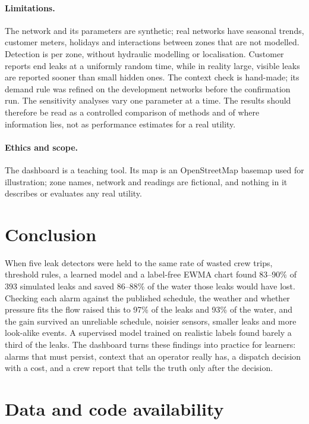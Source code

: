\documentclass[11pt,a4paper]{article}
\begin{document}
\paragraph{Limitations.} The network and its parameters are synthetic; real networks have seasonal trends, customer meters, holidays and interactions between zones that are not modelled. Detection is per zone, without hydraulic modelling or localisation. Customer reports end leaks at a uniformly random time, while in reality large, visible leaks are reported sooner than small hidden ones. The context check is hand-made; its demand rule was refined on the development networks before the confirmation run. The sensitivity analyses vary one parameter at a time. The results should therefore be read as a controlled comparison of methods and of where information lies, not as performance estimates for a real utility.

\paragraph{Ethics and scope.} The dashboard is a teaching tool. Its map is an OpenStreetMap basemap used for illustration; zone names, network and readings are fictional, and nothing in it describes or evaluates any real utility.

\section{Conclusion}

When five leak detectors were held to the same rate of wasted crew trips, threshold rules, a learned model and a label-free EWMA chart found 83--90\% of 393 simulated leaks and saved 86--88\% of the water those leaks would have lost. Checking each alarm against the published schedule, the weather and whether pressure fits the flow raised this to 97\% of the leaks and 93\% of the water, and the gain survived an unreliable schedule, noisier sensors, smaller leaks and more look-alike events. A supervised model trained on realistic labels found barely a third of the leaks. The dashboard turns these findings into practice for learners: alarms that must persist, context that an operator really has, a dispatch decision with a cost, and a crew report that tells the truth only after the decision.

\section*{Data and code availability}
\end{document}
